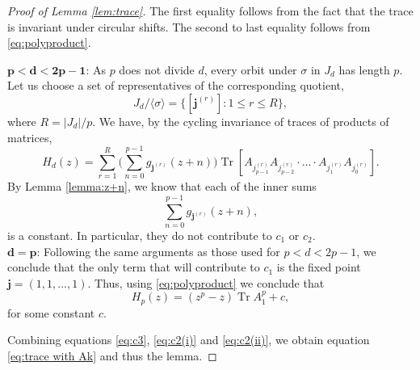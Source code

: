 \documentclass[a4paper,reqno]{amsart}
\numberwithin{equation}{section}
\numberwithin{figure}{section}
\theoremstyle{remark}
\begin{document}
\begin{proof}[Proof of Lemma \ref{lem:trace}]
    The first equality follows from the fact that the trace is invariant under circular shifts. The second to last equality follows from \eqref{eq:polyproduct}.
    \item $\mathbf{p< d <2p-1}$: 
As $p$ does not divide $d$, every orbit under $\sigma$ in $J_d$ has length $p$. Let us choose a set of representatives of the corresponding quotient,
\begin{equation*}
    J_d/\langle \sigma \rangle =\{[\mathbf{j}^{(r)}]:1\leq r \leq R\},
\end{equation*}
where $R=|J_d|/p$. We have, by the cycling invariance of traces of products of matrices,
\begin{equation*}
   H_d(z)=\sum_{r=1}^R\Big( \sum_{n=0}^{p-1}g_{\mathbf{j}^{(r)}}(z+n) \Big) \operatorname{Tr}\left[A_{j_{p-1}^{(r)}}A_{j_{p-2}^{(r)}}\cdot\ldots\cdot A_{j_1^{(r)}}A_{j_0^{(r)}}\right].
\end{equation*}
By Lemma \ref{lemma:z+n}, we know that each of the inner sums
\begin{equation*}
    \sum_{n=0}^{p-1} g_{\mathbf{j}^{(r)}}(z+n),
\end{equation*}
is a constant. In particular, they do not contribute to $c_1$ or $c_2$.\\
$\mathbf{d=p}$: Following the same arguments as those used for $p<d<2p-1$, we conclude that the only term that will contribute to $c_1$ is the fixed point $\mathbf{j} = (1,1,...,1)$. Thus, using \eqref{eq:polyproduct} we conclude that
\begin{equation}
    H_{p}(z) = (z^p-z)\operatorname{Tr}A_1^p+c, \label{eq:c2(ii)}
\end{equation}
for some constant $c$.

Combining equations \eqref{eq:c3}, \eqref{eq:c2(i)} and \eqref{eq:c2(ii)}, we obtain  equation \eqref{eq:trace with Ak} and thus the lemma.
\end{proof}
\end{document}
